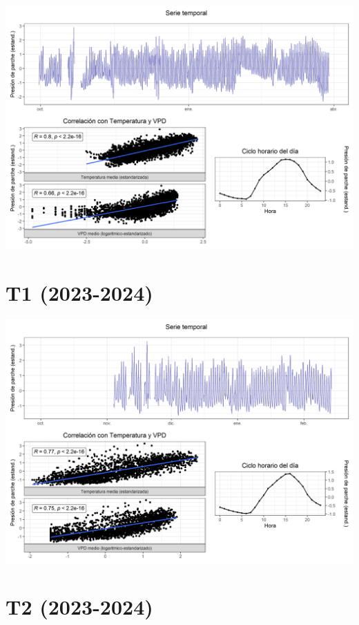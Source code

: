 \documentclass[
  letterpaper,
  DIV=11,
  numbers=noendperiod]{scrreprt}
\begin{document}
\includegraphics{figuras/05_turgor_tratamiento/2022_2023_Rio_Claro_T4.png}

\chapter{T1 (2023-2024)}

\includegraphics{figuras/05_turgor_tratamiento/2023_2024_Rio_Claro_T1.png}

\chapter{T2 (2023-2024)}
\end{document}
